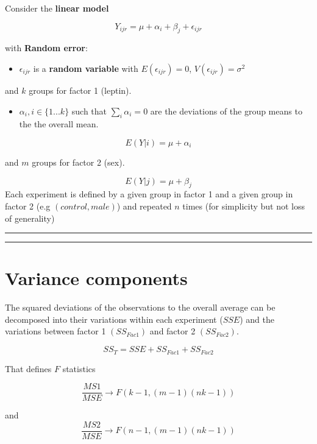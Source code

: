 \documentclass[
]{book}
\providecommand{\tightlist}{%
  \setlength{\itemsep}{0pt}\setlength{\parskip}{0pt}}
\begin{document}
Consider the \textbf{linear model}

\[Y_{ijr} = \mu + \alpha_i + \beta_j + \epsilon_{ijr}\]

with \textbf{Random error}:

\begin{itemize}
\tightlist
\item
  \(\epsilon_{ijr}\) is a \textbf{random variable} with \(E(\epsilon_{ijr})=0\), \(V(\epsilon_{ijr})=\sigma^2\)
\end{itemize}

and \(k\) groups for factor 1 (leptin).

\begin{itemize}
\tightlist
\item
  \(\alpha_i, i \in\{1...k\}\) such that \(\sum_i \alpha_i=0\) are the deviations of the group means to the the overall mean.
\end{itemize}

\[E(Y|i)=\mu + \alpha_i\]

and \(m\) groups for factor 2 (sex).

\[E(Y|j)=\mu + \beta_j\]
Each experiment is defined by a given group in factor 1 and a given group in factor 2 (e.g \((control, male)\)) and repeated \(n\) times (for simplicity but not loss of generality)

\begin{center}\rule{0.5\linewidth}{0.5pt}\end{center}

\begin{center}\rule{0.5\linewidth}{0.5pt}\end{center}

\hypertarget{variance-components-3}{%
\section{Variance components}\label{variance-components-3}}

The squared deviations of the observations to the overall average can be decomposed into their variations within each experiment (\(SSE\)) and the variations between factor 1 \((SS_{Fac1})\) and factor 2 \((SS_{Fac2})\).

\[SS_T= SSE + SS_{Fac1} + SS_{Fac2}\]

That defines \(F\) statistics

\[\frac{MS1}{MSE} \rightarrow F(k-1,(m-1)(nk-1))\]

and \[\frac{MS2}{MSE}\rightarrow F(n-1,(m-1)(nk-1))\]
\end{document}
